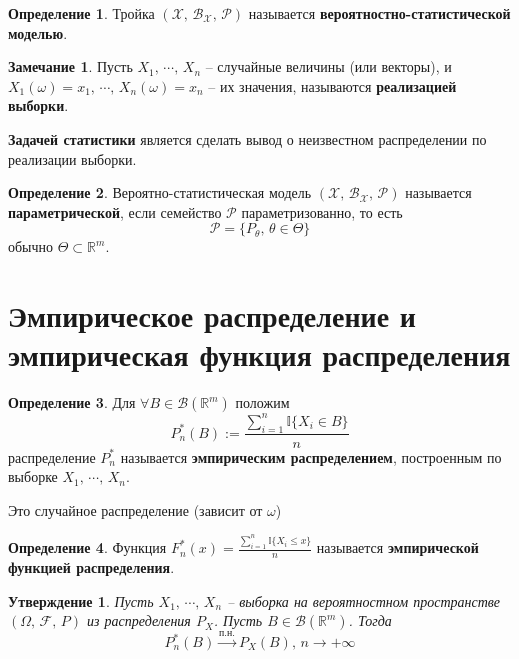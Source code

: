 \documentclass[a4paper,12pt]{article}
\renewcommand{\leq}{\ensuremath{\leqslant}}
\theoremstyle{plain}
\newtheorem{proposition}{Утверждение}[section]
\theoremstyle{definition}
\newtheorem{definition}{Определение}[section]
\newtheorem*{note}{Замечание}
\theoremstyle{remark}
\begin{document}
\begin{definition}
  Тройка $(\mathcal{X},\, \mathcal{B}_\mathcal{X},\, \mathcal{P})$ называется \textbf{вероятностно-статистической моделью}.
\end{definition}

\begin{note}
  Пусть $X_1,\,\cdots,\,X_n$ -- случайные величины (или векторы), и $X_1(\omega) = x_1,\, \cdots,\, X_n(\omega) = x_n$ -- их значения, называются \textbf{реализацией выборки}.

  \textbf{Задачей статистики} является сделать вывод о неизвестном распределении по реализации выборки.
\end{note}

\begin{definition}
  Вероятно-статистическая модель $(\mathcal{X},\, \mathcal{B}_\mathcal{X},\, \mathcal{P})$ называется \textbf{параметрической}, если семейство $\mathcal{P}$ параметризованно, то есть
  \[
    \mathcal{P} = \{P_\theta,\, \theta \in \Theta\}
  \]
  обычно $\Theta \subset \mathbb{R}^m$.
\end{definition}

\section{Эмпирическое распределение и эмпирическая функция распределения}

\begin{definition}
  Для $\forall B \in \mathcal{B}(\mathbb{R}^m)$ положим 
  \[
    P_n^*(B) := \frac{\sum_{i = 1}^n \mathbb{I}\{X_i \in B\}}{n}
  \]
  распределение $P_n^*$ называется \textbf{эмпирическим распределением}, построенным по выборке $X_1,\,\cdots,\,X_n$.

  Это случайное распределение (зависит от $\omega$)
\end{definition}

\begin{definition}
  Функция $F_n^*(x) = \frac{\sum_{i = 1}^n \mathbb{I}\{X_i \leq x\}}{n}$ называется \textbf{эмпирической функцией распределения}.
\end{definition}

\begin{proposition}
  Пусть $X_1,\,\cdots,\,X_n$ -- выборка на вероятностном пространстве $(\Omega,\,\mathcal{F},\, P)$ из распределения $P_X$. Пусть $B \in \mathcal{B}(\mathbb{R}^m)$. Тогда
  \[
    P_n^*(B) \overset{\text{п.н.}}{\to} P_X(B),\, n \to +\infty
  \]
\end{proposition}
\end{document}
